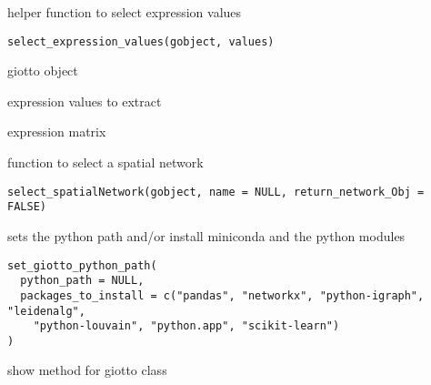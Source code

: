 \documentclass[a4paper]{book}
\begin{document}
%
\begin{Description}\relax
helper function to select expression values
\end{Description}
%
\begin{Usage}
\begin{verbatim}
select_expression_values(gobject, values)
\end{verbatim}
\end{Usage}
%
\begin{Arguments}
\begin{ldescription}
\item[\code{gobject}] giotto object

\item[\code{values}] expression values to extract
\end{ldescription}
\end{Arguments}
%
\begin{Value}
expression matrix
\end{Value}
%
\begin{Description}\relax
function to select a spatial network
\end{Description}
%
\begin{Usage}
\begin{verbatim}
select_spatialNetwork(gobject, name = NULL, return_network_Obj = FALSE)
\end{verbatim}
\end{Usage}
%
\begin{Description}\relax
sets the python path and/or install miniconda and the python modules
\end{Description}
%
\begin{Usage}
\begin{verbatim}
set_giotto_python_path(
  python_path = NULL,
  packages_to_install = c("pandas", "networkx", "python-igraph", "leidenalg",
    "python-louvain", "python.app", "scikit-learn")
)
\end{verbatim}
\end{Usage}
%
\begin{Description}\relax
show method for giotto class
\end{Description}
\end{document}
